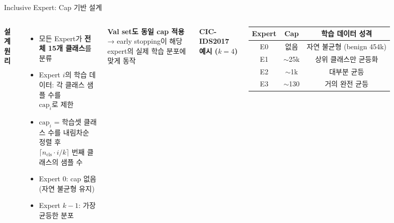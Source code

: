 \documentclass[aspectratio=169]{beamer}
\begin{document}
\begin{frame}{Inclusive Expert: Cap 기반 설계}

\begin{columns}[T]
\textbf{설계 원리}
\begin{itemize}
  \item 모든 Expert가 \textbf{전체 15개 클래스}를 분류
  \item Expert $i$의 학습 데이터: 각 클래스 샘플 수를 \\
        $\text{cap}_i$로 제한
  \item $\text{cap}_i$ = 학습셋 클래스 수를 내림차순 정렬 후\\
        $\lceil n_\text{cls} \cdot i / k \rceil$ 번째 클래스의 샘플 수
  \item Expert 0: cap 없음 (자연 불균형 유지)
  \item Expert $k{-}1$: 가장 균등한 분포
\end{itemize}

\vspace{0.4em}
\textbf{Val set도 동일 cap 적용}\\
{\small → early stopping이 해당 expert의 실제 학습 분포에 맞게 동작}

\vspace{0.4em}
\textbf{CIC-IDS2017 예시 ($k=4$)}\\
\begin{tabular}{ccc}
\toprule
Expert & Cap & 학습 데이터 성격 \\
\midrule
E0 & 없음    & 자연 불균형 (benign 454k) \\
E1 & $\sim$25k & 상위 클래스만 균등화 \\
E2 & $\sim$1k  & 대부분 균등 \\
E3 & $\sim$130 & 거의 완전 균등 \\
\bottomrule
\end{tabular}


\end{columns}
\end{frame}
\end{document}
